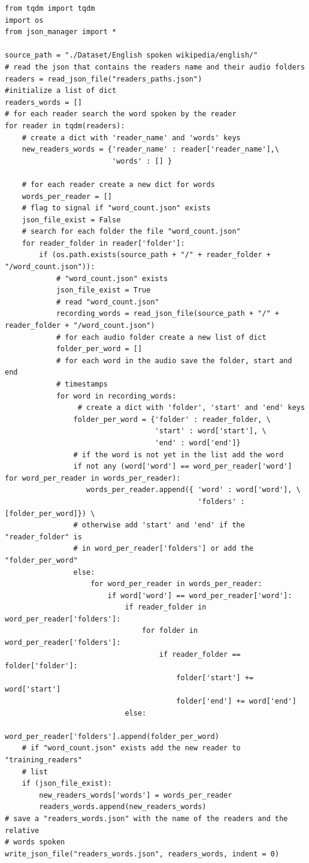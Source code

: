 \documentclass[12pt,a4paper,titlepage]{article}
\begin{document}
\begin{lstlisting}[language=iPython,firstnumber=1, caption=words\_per\_reader.py, label=words_per_reader,captionpos=b]
from tqdm import tqdm
import os
from json_manager import *

source_path = "./Dataset/English spoken wikipedia/english/"
# read the json that contains the readers name and their audio folders
readers = read_json_file("readers_paths.json")
#initialize a list of dict
readers_words = []
# for each reader search the word spoken by the reader
for reader in tqdm(readers):
    # create a dict with 'reader_name' and 'words' keys
    new_readers_words = {'reader_name' : reader['reader_name'],\
                         'words' : [] }

    # for each reader create a new dict for words
    words_per_reader = [] 
    # flag to signal if "word_count.json" exists
    json_file_exist = False
    # search for each folder the file "word_count.json"
    for reader_folder in reader['folder']:
        if (os.path.exists(source_path + "/" + reader_folder + "/word_count.json")):
            # "word_count.json" exists
            json_file_exist = True
            # read "word_count.json"
            recording_words = read_json_file(source_path + "/" + reader_folder + "/word_count.json")
            # for each audio folder create a new list of dict
            folder_per_word = []
            # for each word in the audio save the folder, start and end 
            # timestamps
            for word in recording_words:
                 # create a dict with 'folder', 'start' and 'end' keys
                folder_per_word = {'folder' : reader_folder, \
                                   'start' : word['start'], \
                                   'end' : word['end']}
                # if the word is not yet in the list add the word
                if not any (word['word'] == word_per_reader['word'] for word_per_reader in words_per_reader):
                   words_per_reader.append({ 'word' : word['word'], \
                                             'folders' : [folder_per_word]}) \
                # otherwise add 'start' and 'end' if the "reader_folder" is 
                # in word_per_reader['folders'] or add the "folder_per_word"  
                else:
                    for word_per_reader in words_per_reader:
                        if word['word'] == word_per_reader['word']:
                            if reader_folder in word_per_reader['folders']:
                                for folder in word_per_reader['folders']:
                                    if reader_folder == folder['folder']:
                                        folder['start'] += word['start']
                                        folder['end'] += word['end']
                            else:
                                word_per_reader['folders'].append(folder_per_word)
    # if "word_count.json" exists add the new reader to "training_readers"
    # list     
    if (json_file_exist):
        new_readers_words['words'] = words_per_reader
        readers_words.append(new_readers_words)
# save a "readers_words.json" with the name of the readers and the relative 
# words spoken
write_json_file("readers_words.json", readers_words, indent = 0)


\end{lstlisting}
\end{document}
